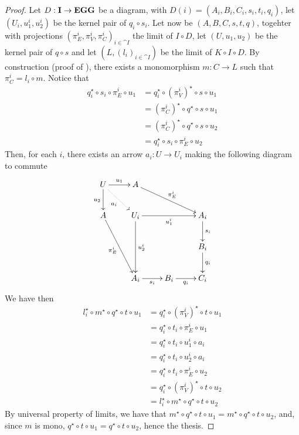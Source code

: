 \begin{proof}
        Let $D: \mathbf{I} \to \textbf{\textup{EGG}}$ be a diagram, with $D(i) = (A_i, B_i, C_i, s_i, t_i, q_i)$, let $(U_i, u_1^i, u_2^i)$ be the kernel pair of $q_i\circ s_i$.
	Let now be $(A, B, C, s, t, q)$, togehter with projections $(\pi_E^i, \pi_V^i, \pi_C^i)_{i \in \cat I}$ the limit of $I \circ D$,
	let $(U, u_1, u_2)$ be the kernel pair of $q\circ s$ and let $(L, (l_i)_{i \in \cat I})$ be the limit of $K \circ I \circ D$.
        By construction (proof of ), there exists a monomorphism $m: C \to L$ such that $\pi_C^i = l_i \circ m$. Notice that
        \begin{align*}
                q_i^\star \circ s_i\circ \pi^i_E\circ u_1      &= q_i^\star\circ (\pi^i_V)^\star \circ s\circ u_1\\
                                                        &= (\pi_C^i)^\star\circ q^\star\circ s\circ u_1\\
                                                        &=(\pi_C^i)^\star\circ q^\star\circ s\circ u_2\\
                                                        &= q_i^\star \circ s_i \circ \pi_E^i \circ u_2
        \end{align*}
        Then, for each $i$, there exists an arrow $a_i:U\to U_i$ making the following diagram to commute
	\[
                \xymatrix{
			U \ar[r]^{u_1} \ar[d]_{u_2} \ar@{.>}[dr]_{a_i} & A \ar[drr]^{\pi_E^i} && \\
			A \ar[ddr]_{\pi_E^i} & U_i \ar[rr]_{u_1^i} \ar[dd]^{u_2^i}&& A_i \ar[d]^{s_i} \\
					     & & & B_i \ar[d]^{q_i}\\
					     & A_i \ar[r]_{s_i} & B_i \ar[r]_{q_i}& C_i
                }
        \]
        We have then
        \begin{align*}
                l_i^\star\circ m^\star \circ q^\star \circ t \circ u_1    &= q_i^\star\circ (\pi_V^i)^\star \circ t \circ u_1 \\
                                                        &= q_i^\star \circ t_i \circ \pi_E^i \circ u_1 \\
                                                        &= q_i^\star \circ t_i \circ u_1^i \circ a_i \\
                                                        &= q_i^\star \circ t_i \circ u_2^i \circ a_i \\
                                                        &= q_i^\star \circ t_i \circ \pi_E^i \circ u_2 \\
                                                        &= q_i^\star \circ (\pi_V^i)^\star \circ t \circ u_2 \\
                                                        &= l_i^\star \circ m^\star \circ q^\star \circ t \circ u_2
        \end{align*}
        By universal property of limits, we have that \- $m^\star\circ q^\star \circ t \circ u_1 = m^\star \circ q^\star \circ t \circ u_2$, and, since $m$ is mono, $q^\star \circ t \circ u_1 = q^\star \circ t \circ u_2$, hence the thesis.
\end{proof}

